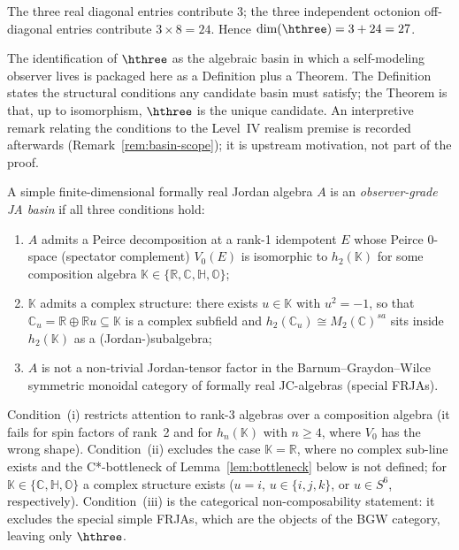 \begin{remark}[Dimension]
The three real diagonal entries contribute $3$; the three independent
octonion off-diagonal entries contribute $3\times 8 = 24$.  Hence
$\dim(\hthree) = 3 + 24 = 27$.
\end{remark}

The identification of $\hthree$ as the algebraic basin in which a
self-modeling observer lives is packaged here as a Definition plus a
Theorem.  The Definition states the structural conditions any
candidate basin must satisfy; the Theorem is that, up to isomorphism,
$\hthree$ is the unique candidate.  An interpretive remark
relating the conditions to the Level~IV realism premise is recorded
afterwards (Remark~\ref{rem:basin-scope}); it is upstream motivation,
not part of the proof.

\begin{definition}\label{def:basin}
A simple finite-dimensional formally real Jordan algebra $A$ is an
\emph{observer-grade JA basin} if all three conditions hold:
\begin{enumerate}[label=(\roman*)]
  \item $A$ admits a Peirce decomposition at a rank-1 idempotent $E$
    whose Peirce 0-space (spectator complement) $V_0(E)$ is
    isomorphic to $h_2(\mathbb{K})$ for some composition algebra
    $\mathbb{K}\in\{\mathbb{R},\mathbb{C},\mathbb{H},\mathbb{O}\}$;
  \item $\mathbb{K}$ admits a complex structure: there exists
    $u\in\mathbb{K}$ with $u^2=-1$, so that
    $\mathbb{C}_u=\mathbb{R}\oplus\mathbb{R}u\subseteq\mathbb{K}$
    is a complex subfield and $h_2(\mathbb{C}_u)\cong
    M_2(\mathbb{C})^{sa}$ sits inside $h_2(\mathbb{K})$ as a
    (Jordan-)subalgebra;
  \item $A$ is not a non-trivial Jordan-tensor factor in the
    Barnum--Graydon--Wilce~\cite{BGW2020} symmetric monoidal
    category of formally real JC-algebras (special FRJAs).
\end{enumerate}
\end{definition}

\noindent
Condition~(i) restricts attention to rank-3 algebras over a
composition algebra (it fails for spin factors of rank~2 and for
$h_n(\mathbb{K})$ with $n\geq 4$, where $V_0$ has the wrong shape).
Condition~(ii) excludes the case $\mathbb{K}=\mathbb{R}$, where no
complex sub-line exists and the C*-bottleneck of
Lemma~\ref{lem:bottleneck} below is not defined; for
$\mathbb{K}\in\{\mathbb{C},\mathbb{H},\mathbb{O}\}$ a complex
structure exists ($u=i$, $u\in\{i,j,k\}$, or $u\in S^6$,
respectively).  Condition~(iii) is the categorical
non-composability statement: it excludes the special simple FRJAs,
which are the objects of the BGW category, leaving only $\hthree$.


